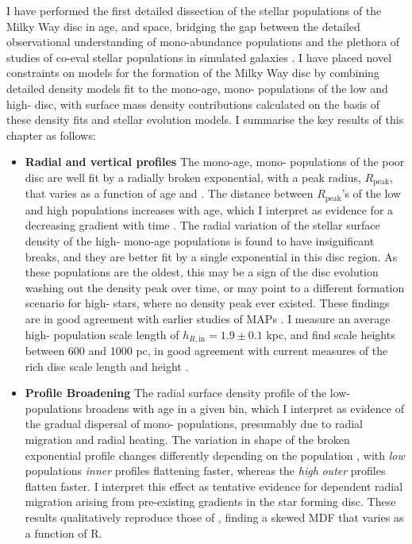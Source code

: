 I have performed the first detailed dissection of the stellar populations of the Milky Way disc in age, \feh{} and \afe{} space, bridging the gap between the detailed observational understanding of mono-abundance populations \citep[e.g.][]{2012ApJ...753..148B,2016ApJ...823...30B} and the plethora of studies of co-eval stellar populations in simulated galaxies \citep[e.g][]{2013ApJ...773...43B,2014MNRAS.442.2474M,2013MNRAS.436..625S}. I have placed novel constraints on models for the formation of the Milky Way disc by combining detailed density models fit to the mono-age, mono-\feh{} populations of the low and high-\afe{} disc, with surface mass density contributions calculated on the basis of these density fits and stellar evolution models. I summarise the key results of this chapter as follows:
\begin{itemize}
\item \textbf{Radial and vertical profiles} The mono-age, mono-\feh{} populations of the \afe{} poor disc are well fit by a radially broken exponential, with a peak radius, $R_{\mathrm{peak}}$, that varies as a function of age and \feh{}. The distance between $R_{\mathrm{peak}}$'s of the low and high \feh{} populations increases with age, which I interpret as evidence for a decreasing \feh{} gradient with time \citep[e.g][]{2016arXiv160804951A}. The radial variation of the stellar surface density of the high-\afe{} mono-age populations is found to have insignificant breaks, and they are better fit by a single exponential in this disc region. As these populations are the oldest, this may be a sign of the disc evolution washing out the density peak over time, or may point to a different formation scenario for high-\afe{} stars, where no density peak ever existed. These findings are in good agreement with earlier studies of MAPs \citep{2016ApJ...823...30B}. I measure an average high-\afe{} population scale length of $h_{R,\text{in}} = 1.9 \pm 0.1$ kpc, and find scale heights between 600 and 1000 pc, in good agreement with current measures of the \afe{} rich disc scale length and height \citep[e.g. those outlined in][]{2016ARA&A..54..529B}. 
\item \textbf{Profile Broadening}  The radial surface density profile of the low-\afe{} populations broadens with age in a given \feh{} bin, which I interpret as evidence of the gradual dispersal of mono-\feh{} populations, presumably due to radial migration and radial heating. The variation in shape of the broken exponential profile changes differently depending on the population \feh{}, with \emph{low} \feh{} populations \emph{inner} profiles flattening faster, whereas the \emph{high} \feh{} \emph{outer} profiles flatten faster. I interpret this effect as tentative evidence for \feh{} dependent radial migration arising from pre-existing \feh{} gradients in the star forming disc. These results qualitatively reproduce those of \citet{2015ApJ...808..132H}, finding a skewed MDF that varies as a function of R.

\end{itemize}
